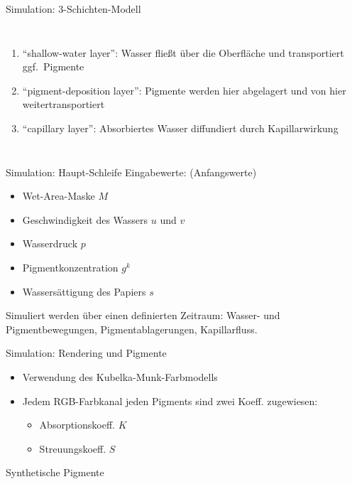 \begin{frame}{Simulation: 3-Schichten-Modell}
  \begin{columns}
	    \begin{enumerate}
	      \item "`shallow-water layer"': Wasser fließt über die Oberfläche und
	      transportiert ggf.\ Pigmente
	      \item "`pigment-deposition layer"': Pigmente werden hier abgelagert und
	      von hier weitertransportiert
	      \item "`capillary layer"': Absorbiertes Wasser diffundiert durch
	      Kapillarwirkung
	    \end{enumerate}

		\par
		\par
  \end{columns}
\end{frame}

\begin{frame}{Simulation: Haupt-Schleife}
  Eingabewerte: (Anfangswerte)
  \begin{itemize}
    \item Wet-Area-Maske $M$
    \item Geschwindigkeit des Wassers $u$ und $v$
    \item Wasserdruck $p$
    \item Pigmentkonzentration $g^k$
    \item Wassersättigung des Papiers $s$
  \end{itemize}
  
  \pause
  Simuliert werden über einen definierten Zeitraum: Wasser- und Pigmentbewegungen,
  Pigmentablagerungen, Kapillarfluss.
\end{frame}

\begin{frame}{Simulation: Rendering und Pigmente}
  \begin{itemize}
    \item Verwendung des Kubelka-Munk-Farbmodells
    \item Jedem RGB-Farbkanal jeden Pigments sind zwei Koeff. zugewiesen:
    \begin{itemize}
      \item Absorptionskoeff. $K$
      \item Streuungskoeff. $S$
    \end{itemize}
  \end{itemize}
  
  \begin{block}{Synthetische Pigmente}
  \end{block}
\end{frame}

